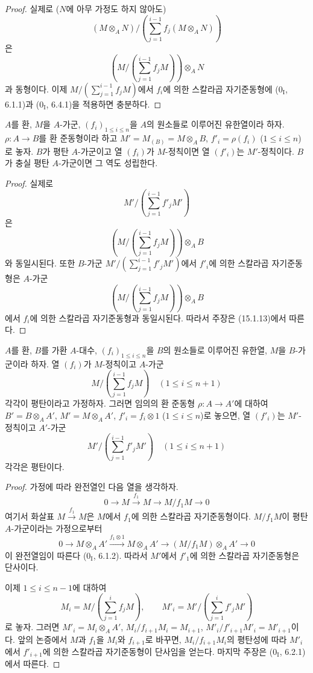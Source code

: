 \begin{proof}
실제로 ($N$에 아무 가정도 하지 않아도)
\[
  (M\otimes_A N)/
  \left(\sum_{j=1}^{i-1}f_j(M\otimes_A N)\right)
\]
은
\[
  \left(M/\left(\sum_{j=1}^{i-1}f_jM\right)\right)\otimes_A N
\]
과 동형이다. 이제 $M/(\sum_{j=1}^{i-1}f_jM)$에서 $f_i$에 의한
스칼라곱 자기준동형에 ($0_{\mathrm I}$, 6.1.1)과
($0_{\mathrm I}$, 6.4.1)을 적용하면 충분하다.
\end{proof}

\begin{corollary}[15.1.14]
\label{0.15.1.14-fr}
$A$를 환, $M$을 $A$-가군, $(f_i)_{1\leq i\leq n}$을 $A$의 원소들로
이루어진 유한열이라 하자. $\rho:A\to B$를 환 준동형이라 하고
$M'=M_{(B)}=M\otimes_A B$, $f'_i=\rho(f_i)$
($1\leq i\leq n$)로 놓자. $B$가 평탄 $A$-가군이고 열 $(f_i)$가
$M$-정칙이면 열 $(f'_i)$는 $M'$-정칙이다. $B$가 충실 평탄
$A$-가군이면 그 역도 성립한다.
\end{corollary}

\begin{proof}
실제로
\[
  M'/\left(\sum_{j=1}^{i-1}f'_jM'\right)
\]
은
\[
  \left(M/\left(\sum_{j=1}^{i-1}f_jM\right)\right)\otimes_A B
\]
와 동일시된다. 또한 $B$-가군
$M'/(\sum_{j=1}^{i-1}f'_jM')$에서 $f'_i$에 의한 스칼라곱
자기준동형은 $A$-가군
\[
  \left(M/\left(\sum_{j=1}^{i-1}f_jM\right)\right)\otimes_A B
\]
에서 $f_i$에 의한 스칼라곱 자기준동형과 동일시된다. 따라서 주장은
(15.1.13)에서 따른다.
\end{proof}

\begin{proposition}[15.1.15]
\label{0.15.1.15-fr}
$A$를 환, $B$를 가환 $A$-대수, $(f_i)_{1\leq i\leq n}$을 $B$의
원소들로 이루어진 유한열, $M$을 $B$-가군이라 하자. 열 $(f_i)$가
$M$-정칙이고 $A$-가군
\[
  M/\left(\sum_{j=1}^{i-1}f_jM\right)\quad(1\leq i\leq n+1)
\]
각각이 평탄이라고 가정하자. 그러면 임의의 환 준동형
$\rho:A\to A'$에 대하여
$B'=B\otimes_A A'$, $M'=M\otimes_A A'$, $f'_i=f_i\otimes1$
($1\leq i\leq n$)로 놓으면, 열 $(f'_i)$는 $M'$-정칙이고
$A'$-가군
\[
  M'/\left(\sum_{j=1}^{i-1}f'_jM'\right)\quad(1\leq i\leq n+1)
\]
각각은 평탄이다.
\end{proposition}

\begin{proof}
가정에 따라 완전열인 다음 열을 생각하자.
\[
  0\longrightarrow M\xrightarrow{f_1}M\longrightarrow M/f_1M
  \longrightarrow0
\]
여기서 화살표 $M\xrightarrow{f_1}M$은 $M$에서 $f_1$에 의한 스칼라곱
자기준동형이다. $M/f_1M$이 평탄 $A$-가군이라는 가정으로부터
\[
  0\longrightarrow M\otimes_A A'
  \xrightarrow{f_1\otimes1}M\otimes_A A'
  \longrightarrow(M/f_1M)\otimes_A A'\longrightarrow0
\]
이 완전열임이 따른다 ($0_{\mathrm I}$, 6.1.2). 따라서 $M'$에서
$f'_1$에 의한 스칼라곱 자기준동형은 단사이다.

이제 $1\leq i\leq n-1$에 대하여
\[
  M_i=M/\left(\sum_{j=1}^i f_jM\right),\qquad
  M'_i=M'/\left(\sum_{j=1}^i f'_jM'\right)
\]
로 놓자. 그러면 $M'_i=M_i\otimes_A A'$,
$M_i/f_{i+1}M_i=M_{i+1}$,
$M'_i/f'_{i+1}M'_i=M'_{i+1}$이다. 앞의 논증에서 $M$과 $f_1$을
$M_i$와 $f_{i+1}$로 바꾸면, $M_i/f_{i+1}M_i$의 평탄성에 따라
$M'_i$에서 $f'_{i+1}$에 의한 스칼라곱 자기준동형이 단사임을 얻는다.
마지막 주장은 ($0_{\mathrm I}$, 6.2.1)에서 따른다.
\end{proof}

